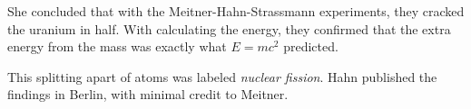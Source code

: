 She concluded that with the Meitner-Hahn-Strassmann experiments, they cracked the uranium in half. With calculating the energy, they confirmed that the extra energy from the mass was exactly what \emph{\(E=mc^2\)} predicted.

This splitting apart of atoms was labeled \emph{nuclear fission}. Hahn published the findings in Berlin, with minimal credit to Meitner.

